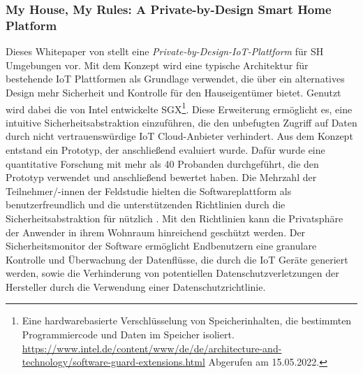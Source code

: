         \subsubsection*{My House, My Rules: A Private-by-Design Smart Home Platform}
            Dieses Whitepaper von \cite{Zavalyshyn2020} stellt eine \textit{Private-by-Design-IoT-Plattform} für \acl{SH} 
            Umgebungen vor. Mit dem Konzept wird eine typische Architektur für bestehende \acs{IoT} Plattformen als Grundlage 
            verwendet, die über ein alternatives Design mehr Sicherheit und Kontrolle für den Hauseigentümer bietet. 
            Genutzt wird dabei die von Intel entwickelte \ac{SGX}\footnote{Eine hardwarebasierte Verschlüsselung von Speicherinhalten, die bestimmten Programmiercode und Daten im Speicher isoliert. \url{https://www.intel.de/content/www/de/de/architecture-and-technology/software-guard-extensions.html} Abgerufen am 15.05.2022.}. 
            Diese Erweiterung ermöglicht es, eine intuitive Sicherheitsabstraktion einzuführen, die den unbefugten Zugriff auf Daten 
            durch nicht vertrauenswürdige \acs{IoT} Cloud-Anbieter verhindert. Aus dem Konzept entstand ein Prototyp, der anschließend evaluiert wurde. 
            Dafür wurde eine quantitative Forschung mit mehr als 40 Probanden durchgeführt, die 
            den Prototyp verwendet und anschließend bewertet haben. Die Mehrzahl der Teilnehmer/-innen der Feldstudie 
            hielten die Softwareplattform als benutzerfreundlich und die unterstützenden Richtlinien durch die Sicherheitsabstraktion 
            für nützlich \cite{Zavalyshyn2020}. Mit den Richtlinien kann die Privatsphäre der Anwender in ihrem Wohnraum hinreichend 
            geschützt werden. Der Sicherheitsmonitor der Software ermöglicht Endbenutzern eine granulare Kontrolle und Überwachung 
            der Datenflüsse, die durch die \acs{IoT} Geräte generiert werden, sowie die Verhinderung von potentiellen 
            Datenschutzverletzungen der Hersteller durch die Verwendung einer Datenschutzrichtlinie. 

